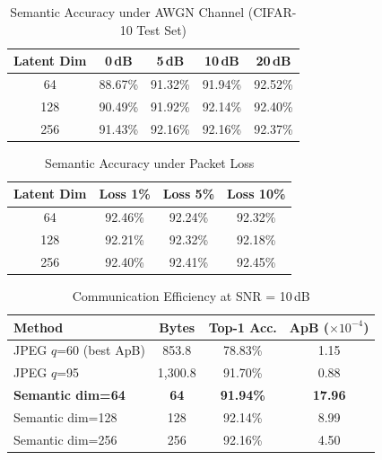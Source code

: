 \documentclass[conference]{IEEEtran}
\begin{document}
\begin{table}[htbp]
\caption{Semantic Accuracy under AWGN Channel (CIFAR-10 Test Set)}
\label{tab:awgn}
\begin{center}
\begin{tabular}{ccccc}
\toprule
\textbf{Latent Dim} & \textbf{0\,dB} & \textbf{5\,dB} & \textbf{10\,dB} & \textbf{20\,dB} \\
\midrule
64  & 88.67\% & 91.32\% & 91.94\% & 92.52\% \\
128 & 90.49\% & 91.92\% & 92.14\% & 92.40\% \\
256 & 91.43\% & 92.16\% & 92.16\% & 92.37\% \\
\bottomrule
\end{tabular}
\end{center}
\end{table}

\begin{table}[htbp]
\caption{Semantic Accuracy under Packet Loss}
\label{tab:pktloss}
\begin{center}
\begin{tabular}{cccc}
\toprule
\textbf{Latent Dim} & \textbf{Loss 1\%} & \textbf{Loss 5\%} & \textbf{Loss 10\%} \\
\midrule
64  & 92.46\% & 92.24\% & 92.32\% \\
128 & 92.21\% & 92.32\% & 92.18\% \\
256 & 92.40\% & 92.41\% & 92.45\% \\
\bottomrule
\end{tabular}
\end{center}
\end{table}

\begin{table}[htbp]
\caption{Communication Efficiency at SNR = 10\,dB}
\label{tab:efficiency}
\begin{center}
\begin{tabular}{lccc}
\toprule
\textbf{Method} & \textbf{Bytes} & \textbf{Top-1 Acc.} & \textbf{ApB ($\times10^{-4}$)} \\
\midrule
JPEG $q$=60 (best ApB) & 853.8  & 78.83\% & 1.15 \\
JPEG $q$=95            & 1{,}300.8 & 91.70\% & 0.88 \\
\textbf{Semantic dim=64}  & \textbf{64}  & \textbf{91.94\%} & \textbf{17.96} \\
Semantic dim=128       & 128    & 92.14\% & 8.99 \\
Semantic dim=256       & 256    & 92.16\% & 4.50 \\
\bottomrule
\end{tabular}
\end{center}
\end{table}
\end{document}
